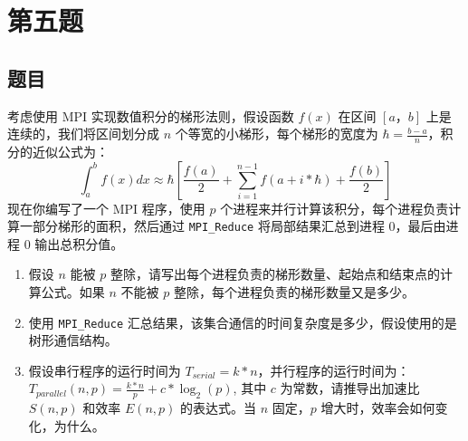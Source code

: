 \chapter{第五题}

\section{题目}

考虑使用 MPI 实现数值积分的梯形法则，假设函数 $f(x)$ 在区间 $[a，b]$ 上是连续的，我们将区间划分成 $n$ 个等宽的小梯形，每个梯形的宽度为 $\hbar = \frac{b-a}{n}$，积分的近似公式为：
$$ \int_a^b f(x)dx \approx \hbar \left[ \frac{f(a)}{2} + \sum_{i=1}^{n-1} f(a+ i \ast \hbar) + \frac{f(b)}{2} \right] $$
现在你编写了一个 MPI 程序，使用 $p$ 个进程来并行计算该积分，每个进程负责计算一部分梯形的面积，然后通过 \texttt{MPI\_Reduce} 将局部结果汇总到进程 0，最后由进程 0 输出总积分值。

\begin{enumerate}
    \item 假设 $n$ 能被 $p$ 整除，请写出每个进程负责的梯形数量、起始点和结束点的计算公式。如果 $n$ 不能被 $p$ 整除，每个进程负责的梯形数量又是多少。
    \item 使用 \texttt{MPI\_Reduce} 汇总结果，该集合通信的时间复杂度是多少，假设使用的是树形通信结构。
    \item 假设串行程序的运行时间为 $T_{serial}= k \ast n$，并行程序的运行时间为：$T_{parallel}(n, p)= \frac{k \ast n}{p} + c \ast \log_2(p)$, 其中 $c$ 为常数，请推导出加速比 $S(n, p)$ 和效率 $E(n, p)$ 的表达式。当 $n$ 固定，$p$ 增大时，效率会如何变化，为什么。
\end{enumerate}

